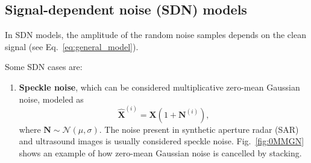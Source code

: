 \documentclass{article}
\begin{document}
\subsection{Signal-dependent noise (SDN) models}
In SDN models, the amplitude of the random noise samples depends on
the clean signal (see Eq.~\ref{eq:general_model}).


Some SDN cases are:
\begin{enumerate}
\item \textbf{Speckle noise}, which can be considered multiplicative
  zero-mean Gaussian noise, modeled as
  \begin{equation}
    \hat{\mathbf X}^{(i)} = {\mathbf X} (1 + {\mathbf N}^{(i)}),
    \label{eq:MGN}
  \end{equation}
  where ${\mathbf N}\sim{\mathcal N}(\mu,\sigma)$. The noise present
  in synthetic aperture radar (SAR) and ultrasound images is usually
  considered speckle noise. Fig.~\ref{fig:0MMGN} shows an example of how zero-mean Gaussian noise
  is cancelled by stacking.


\end{enumerate}
\end{document}
